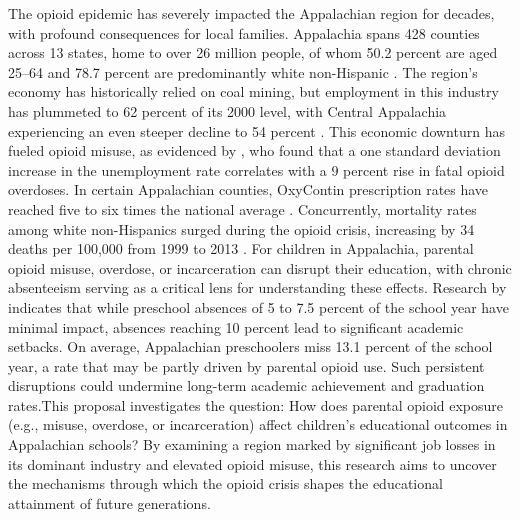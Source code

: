 The opioid epidemic has severely impacted the Appalachian region for decades, with profound consequences for local families. Appalachia spans 428 counties across 13 states, home to over 26 million people, of whom 50.2 percent are aged 25–64 and 78.7 percent are predominantly white non-Hispanic \citep{srygleyAPPALACHIANREGIONDATA}. The region’s economy has historically relied on coal mining, but employment in this industry has plummeted to 62 percent of its 2000 level, with Central Appalachia experiencing an even steeper decline to 54 percent \citep{CoalProductionEmployment}. This economic downturn has fueled opioid misuse, as evidenced by \citet{hollingsworthMacroeconomicConditionsOpioid2017}, who found that a one standard deviation increase in the unemployment rate correlates with a 9 percent rise in fatal opioid overdoses. In certain Appalachian counties, OxyContin prescription rates have reached five to six times the national average \citep{moodySubstanceUseRural2017}. Concurrently, mortality rates among white non-Hispanics surged during the opioid crisis, increasing by 34 deaths per 100,000 from 1999 to 2013 \citep{caseRisingMorbidityMortality2015}. For children in Appalachia, parental opioid misuse, overdose, or incarceration can disrupt their education, with chronic absenteeism serving as a critical lens for understanding these effects. Research by \citet{rhoad-drogalisAbsenteeismAppalachianPreschool2018} indicates that while preschool absences of 5 to 7.5 percent of the school year have minimal impact, absences reaching 10 percent lead to significant academic setbacks. On average, Appalachian preschoolers miss 13.1 percent of the school year, a rate that may be partly driven by parental opioid use. Such persistent disruptions could undermine long-term academic achievement and graduation rates.This proposal investigates the question: How does parental opioid exposure (e.g., misuse, overdose, or incarceration) affect children’s educational outcomes in Appalachian schools? By examining a region marked by significant job losses in its dominant industry and elevated opioid misuse, this research aims to uncover the mechanisms through which the opioid crisis shapes the educational attainment of future generations.